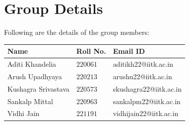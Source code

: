 \section*{Group Details}
Following are the details of the group members:

\begin{table}[H]
  \centering
  \begin{tabular}{lll}
    \toprule
    \textbf{Name} & \textbf{Roll No.} & \textbf{Email ID} \\
    \midrule
    Aditi Khandelia & $220061$ & aditikh22@iitk.ac.in \\
    Arush Upadhyaya & $220213$ & arushu22@iitk.ac.in \\ 
    Kushagra Srivastava & $220573$ & skushagra22@iitk.ac.in \\  
    Sankalp Mittal & $220963$ & sankalpm22@iitk.ac.in \\
    Vidhi Jain & $221191$ & vidhijain22@iitk.ac.in \\
    \bottomrule
  \end{tabular}
  \label{tab:table1}
\end{table}